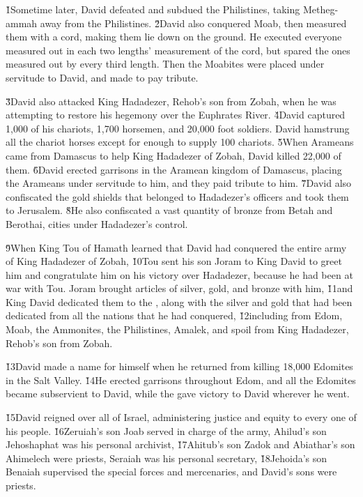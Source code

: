 \v{1}Sometime later, David defeated and subdued the Philistines, taking Metheg-ammah away from the Philistines. \v{2}David also conquered Moab, then measured them with a cord, making them lie down on the ground. He executed everyone measured out in each two lengths' measurement of the cord, but spared the ones measured out by every third length. Then the Moabites were placed under servitude to David, and made to pay tribute.

\v{3}David also attacked King Hadadezer, Rehob's son from Zobah, when he was attempting to restore his hegemony over the Euphrates River. \v{4}David captured 1,000 of his chariots, 1,700 horsemen, and 20,000 foot soldiers. David hamstrung all the chariot horses except for enough to supply 100 chariots. \v{5}When Arameans came from Damascus to help King Hadadezer of Zobah, David killed 22,000 of them. \v{6}David erected garrisons in the Aramean kingdom of Damascus, placing the Arameans under servitude to him, and they paid tribute to him. \v{7}David also confiscated the gold shields that belonged to Hadadezer's officers and took them to Jerusalem. \v{8}He also confiscated a vast quantity of bronze from Betah and Berothai, cities under Hadadezer's control.

\v{9}When King Tou of Hamath learned that David had conquered the entire army of King Hadadezer of Zobah, \v{10}Tou sent his son Joram to King David to greet him and congratulate him on his victory over Hadadezer, because he had been at war with Tou. Joram brought articles of silver, gold, and bronze with him, \v{11}and King David dedicated them to the , along with the silver and gold that had been dedicated from all the nations that he had conquered, \v{12}including from Edom, Moab, the Ammonites, the Philistines, Amalek, and spoil from King Hadadezer, Rehob's son from Zobah.

\v{13}David made a name for himself when he returned from killing 18,000 Edomites in the Salt Valley. \v{14}He erected garrisons throughout Edom, and all the Edomites became subservient to David, while the  gave victory to David wherever he went.

\v{15}David reigned over all of Israel, administering justice and equity to every one of his people. \v{16}Zeruiah's son Joab served in charge of the army, Ahilud's son Jehoshaphat was his personal archivist, \v{17}Ahitub's son Zadok and Abiathar's son Ahimelech were priests, Seraiah was his personal secretary, \v{18}Jehoida's son Benaiah supervised the special forces and mercenaries, and David's sons were priests.

